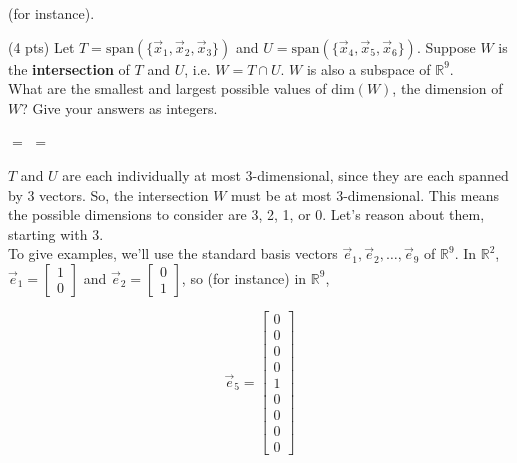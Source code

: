 \documentclass[11pt]{article}
\begin{document}
\begin{prob}[(14 pts)]
\begin{subprob}
\begin{solution}
(for instance).

\end{solution}

\end{subprob}

\vspace{1em}

\begin{subprob}(4 pts) Let $T = \text{span}(\{ \vec x_1, \vec x_2, \vec x_3 \})$ and $U = \text{span}(\{ \vec x_4, \vec x_5, \vec x_6 \})$. Suppose $W$ is the \textbf{intersection} of $T$ and $U$, i.e. $W = T \cap U$. $W$ is also a subspace of $\mathbb{R}^9$. \\

What are the smallest and largest possible values of $\text{dim}(W)$, the dimension of $W$? Give your answers as integers.

 $=$  \qquad {} $=$ 

\begin{solution}
$T$ and $U$ are each individually at most 3-dimensional, since they are each spanned by 3 vectors. So, the intersection $W$ must be at most 3-dimensional. This means the possible dimensions to consider are 3, 2, 1, or 0. Let's reason about them, starting with 3. \\

To give examples, we'll use the standard basis vectors $\vec e_1, \vec e_2, \ldots, \vec e_9$ of $\mathbb{R}^9$. In $\mathbb{R}^2$, $\vec e_1 = \begin{bmatrix} 1 \\ 0 \end{bmatrix}$ and $\vec e_2 = \begin{bmatrix} 0 \\ 1 \end{bmatrix}$, so (for instance) in $\mathbb{R}^9$,

$$\vec e_5 = \begin{bmatrix} 0 \\ 0 \\ 0 \\ 0 \\ 1 \\ 0 \\ 0 \\ 0 \\ 0 \end{bmatrix}$$



\end{solution}
\end{subprob}
\end{prob}
\end{document}
